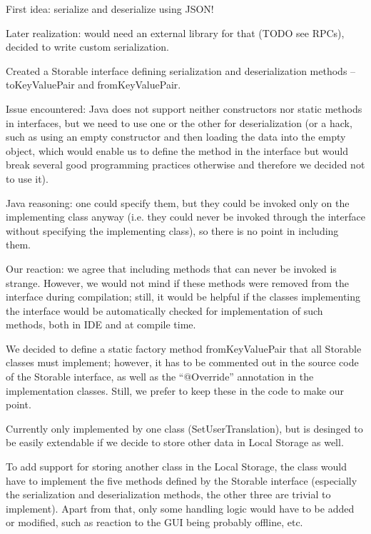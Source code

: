First idea: serialize and deserialize using JSON!

Later realization: would need an external library for that (TODO see RPCs), decided to write custom serialization.

Created a Storable interface defining serialization and deserialization methods -- toKeyValuePair and fromKeyValuePair.

Issue encountered: Java does not support neither constructors nor static methods in interfaces, but we need to use one or the other for deserialization (or a hack, such as using an empty constructor and then loading the data into the empty object, which would enable us to define the method in the interface but would break several good programming practices otherwise and therefore we decided not to use it).


Java reasoning: one could specify them, but they could be invoked only on the implementing class anyway (i.e. they could never be invoked through the interface without specifying the implementing class), so there is no point in including them.

Our reaction: we agree that including methods that can never be invoked is strange. However, we would not mind if these methods were removed from the interface during compilation; still, it would be helpful if the classes implementing the interface would be automatically checked for implementation of such methods, both in IDE and at compile time.

We decided to define a static factory method fromKeyValuePair that all Storable classes must implement; however, it has to be commented out in the source code of the Storable interface, as well as the ``@Override'' annotation in the implementation classes. Still, we prefer to keep these in the code to make our point.


Currently only implemented by one class (SetUserTranslation), but is desinged to be easily extendable if we decide to store other data in Local Storage as well.

To add support for storing another class in the Local Storage, the class would have to implement the five methods defined by the Storable interface (especially the serialization and deserialization methods, the other three are trivial to implement). Apart from that, only some handling logic would have to be added or modified, such as reaction to the GUI being probably offline, etc.

